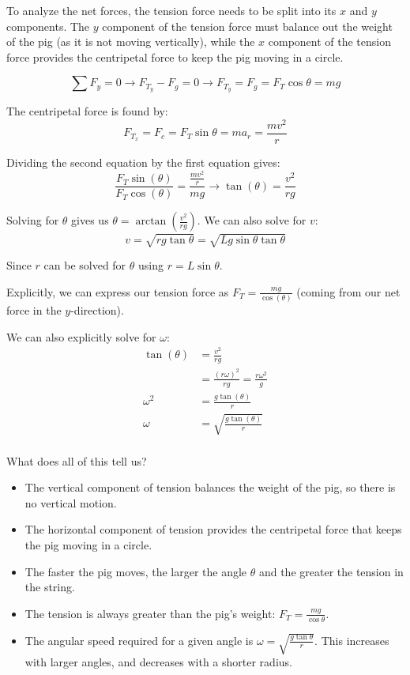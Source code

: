 To analyze the net forces, the tension force needs to be split into its $x$ and $y$ components. The $y$ component of the tension force must balance out the weight of the pig (as it is not moving vertically), while the $x$ component of the tension force provides the centripetal force to keep the pig moving in a circle.

\[
  \sum F_y = 0 \to F_{T_y} - F_g = 0 \to F_{T_y} = F_g = F_T \cos{\theta} = mg
\]

The centripetal force is found by:
\[
  F_{T_x} = F_c = F_T \sin{\theta} = ma_r = \frac{mv^2}{r}
\]

Dividing the second equation by the first equation gives:
\[
  \frac{F_T \sin(\theta)}{F_T \cos(\theta)} = \frac{\frac{mv^2}{r}}{mg} \to \tan(\theta) = \frac{v^2}{rg}
\]

Solving for $\theta$ gives us $\theta = \arctan\left(\frac{v^2}{rg}\right)$. We can also solve for $v$:
$$v = \sqrt{r g \tan\theta} = \sqrt{L g \sin\theta \tan\theta}$$

Since $r$ can be solved for $\theta$ using $r = L \sin\theta$.

Explicitly, we can express our tension force as $F_T = \frac{mg}{\cos(\theta)}$ (coming from our net force in the $y$-direction).

We can also explicitly solve for $\omega$:
\begin{align*}
  \tan(\theta) & = \frac{v^2}{rg}                               \\
               & = \frac{(r\omega)^2}{rg} = \frac{r\omega^2}{g} \\
  \omega^2     & =\frac{g\tan(\theta)}{r}                       \\
  \omega       & =\sqrt{\frac{g\tan(\theta)}{r}}                \\
\end{align*}

What does all of this tell us?
\begin{itemize}
  \item The vertical component of tension balances the weight of the pig, so there is no vertical motion.
  \item The horizontal component of tension provides the centripetal force that keeps the pig moving in a circle.
  \item The faster the pig moves, the larger the angle $\theta$ and the greater the tension in the string.
  \item The tension is always greater than the pig's weight: $F_T = \frac{mg}{\cos\theta}$.
  \item The angular speed required for a given angle is $\omega = \sqrt{\frac{g\tan\theta}{r}}$. This increases with larger angles, and decreases with a shorter radius.
\end{itemize}

